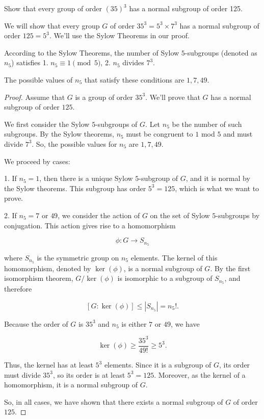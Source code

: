 \documentclass[12pt]{amsart}
\theoremstyle{definition}
\numberwithin{equation}{section}
\theoremstyle{plain}
\begin{document}
\vspace*{20pt}
\begin{exercise}{17}
Show that every group of order $(35)^3$ has a normal subgroup of order 125.

We will show that every group \(G\) of order \(35^3 = 5^3 \times 7^3\) has a normal subgroup of order \(125 = 5^3\). We'll use the Sylow Theorems in our proof.

According to the Sylow Theorems, the number of Sylow \(5\)-subgroups (denoted as \(n_5\)) satisfies
1. \(n_5 \equiv 1 \pmod{5}\),
2. \(n_5\) divides \(7^3\).

The possible values of \(n_5\) that satisfy these conditions are \(1, 7, 49\).

\begin{proof}
Assume that \(G\) is a group of order \(35^3\). We'll prove that \(G\) has a normal subgroup of order \(125\).

We first consider the Sylow \(5\)-subgroups of \(G\). Let \(n_5\) be the number of such subgroups. By the Sylow theorems, \(n_5\) must be congruent to \(1\) mod \(5\) and must divide \(7^3\). So, the possible values for \(n_5\) are \(1, 7, 49\).

We proceed by cases:

1. If \(n_5 = 1\), then there is a unique Sylow \(5\)-subgroup of \(G\), and it is normal by the Sylow theorems. This subgroup has order \(5^3 = 125\), which is what we want to prove.

2. If \(n_5 = 7\) or \(49\), we consider the action of \(G\) on the set of Sylow \(5\)-subgroups by conjugation. This action gives rise to a homomorphism

\[
\phi: G \to S_{n_5}
\]

where \(S_{n_5}\) is the symmetric group on \(n_5\) elements. The kernel of this homomorphism, denoted by \(\ker(\phi)\), is a normal subgroup of \(G\). By the first isomorphism theorem, \(G/\ker(\phi)\) is isomorphic to a subgroup of \(S_{n_5}\), and therefore

\[
[G : \ker(\phi)] \leq |S_{n_5}| = n_5!.
\]

Because the order of \(G\) is \(35^3\) and \(n_5\) is either \(7\) or \(49\), we have

\[
\ker(\phi) \geq \frac{35^3}{49!} \geq 5^3.
\]

Thus, the kernel has at least \(5^3\) elements. Since it is a subgroup of \(G\), its order must divide \(35^3\), so its order is at least \(5^3 = 125\). Moreover, as the kernel of a homomorphism, it is a normal subgroup of \(G\).

So, in all cases, we have shown that there exists a normal subgroup of \(G\) of order \(125\).
\end{proof}
\end{exercise}
\end{document}
